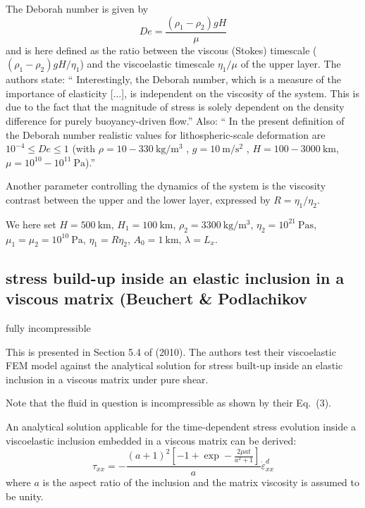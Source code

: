 The Deborah number is given by
\[
De=\frac{(\rho_1-\rho_2)g H}{\mu}
\]
and is here defined as the ratio between the viscous (Stokes) timescale ($(\rho_1-\rho_2)g H/\eta_1$)
and the viscoelastic timescale $\eta_1/\mu$ of the upper layer.
The authors state: ``
Interestingly, the Deborah number, which is a measure of the importance of
elasticity [...], is independent on the viscosity of the system. 
This is due to the fact that the magnitude of stress is solely
dependent on the density difference for purely buoyancy-driven flow.''
Also: ``
In the present definition of the Deborah number realistic values for 
lithospheric-scale deformation are $10^{-4} \le De \le 1$ 
(with $\rho =10-330~\si{\kg\per\cubic\meter}$ , 
$g = 10~\si{\meter\per\square\second}$ , $H = 100-3000~\si{\km}$, 
$\mu=10^{10}-10^{11}~\si{\pascal}$).''

Another parameter controlling the dynamics of the system is the viscosity contrast 
between the upper and the lower layer, expressed by $R=\eta_1/\eta_2$.

We here set $H=500~\si{\km}$, $H_1=100~\si{\km}$,
$\rho_2=3300~\si{\kg\per\cubic\meter}$, $\eta_2=10^{21}~\si{\pascal\second}$,
$\mu_1=\mu_2=10^{10}~\si{\pascal}$, $\eta_1=R\eta_2$,
$A_0=1~\si{\km}$, $\lambda=L_x$.







\subsection{stress build-up inside an elastic inclusion in a viscous matrix (Beuchert \& Podlachikov}

{\color{orange} fully incompressible}

This is presented in Section 5.4 of \textcite{bepo10} (2010).
The authors test their viscoelastic FEM model against the analytical solution 
for stress built-up inside an elastic inclusion in a viscous matrix under pure shear. 


Note that the fluid in question is incompressible as shown by their Eq.~(3).

An analytical solution applicable for the time-dependent stress evolution inside 
a viscoelastic inclusion embedded in a viscous matrix can be derived:
\[
\tau_{xx} = -\frac{(a+1)^2 \left[-1+\exp -\frac{2\mu a t }{a^2+1}  \right]}{a} \dot\varepsilon^d_{xx}
\]
where $a$ is the aspect ratio of the inclusion and the matrix viscosity is assumed to be unity.

